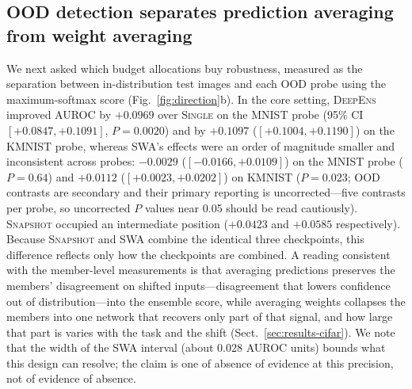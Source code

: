 \documentclass[11pt,a4paper]{article}
\newcommand{\deepens}{\textsc{DeepEns}}
\newcommand{\snapshot}{\textsc{Snapshot}}
\newcommand{\swa}{\textsc{SWA}}
\newcommand{\single}{\textsc{Single}}
\begin{document}
\subsection{OOD detection separates prediction averaging from weight
averaging}\label{sec:results-ood}

We next asked which budget allocations buy robustness, measured as the
separation between in-distribution test images and each OOD probe using
the maximum-softmax score (Fig.~\ref{fig:direction}b). In the core
setting, \deepens{} improved AUROC by $+0.0969$ over \single{} on the MNIST
probe (95\% CI $[+0.0847,+0.1091]$, $P=0.0020$) and by $+0.1097$
($[+0.1004,+0.1190]$) on the KMNIST probe, whereas \swa{}'s effects were
an order of magnitude smaller and inconsistent across probes: $-0.0029$
($[-0.0166,+0.0109]$) on the MNIST probe ($P=0.64$) and $+0.0112$
($[+0.0023,+0.0202]$) on KMNIST ($P=0.023$; OOD contrasts are secondary and
their primary reporting is uncorrected---five contrasts per probe, so
uncorrected $P$ values near 0.05 should be read cautiously). \snapshot{} occupied an intermediate
position ($+0.0423$ and $+0.0585$ respectively). Because \snapshot{} and
\swa{} combine the identical three checkpoints, this difference reflects
only how the checkpoints are combined. A reading consistent with the
member-level measurements is that averaging predictions preserves the
members' disagreement on shifted inputs---disagreement that lowers
confidence out of distribution---into the ensemble score, while averaging
weights collapses the members into one network that recovers only part of
that signal, and how large that
part is varies with the task and the shift
(Sect.~\ref{sec:results-cifar}). We note that the width of the \swa{} interval
(about $0.028$ AUROC units) bounds what this design can resolve; the claim
is one of absence of evidence at this precision, not of evidence of
absence.
\end{document}
